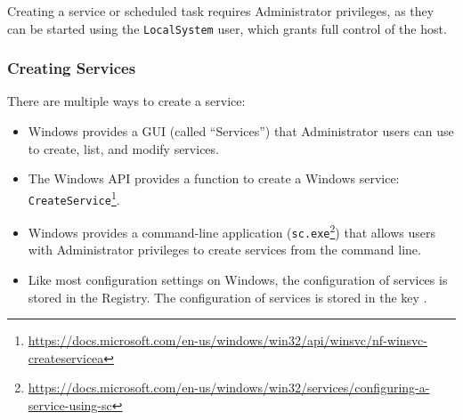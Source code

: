 Creating a service or scheduled task requires Administrator privileges, as they can be started using the \texttt{LocalSystem} user, which grants full control of the host.

\subsubsection{Creating Services}
There are multiple ways to create a service:
\begin{itemize}
    \item Windows provides a GUI (called ``Services'') that Administrator users can use to create, list, and modify services.

    \item The Windows API provides a function to create a Windows service: \texttt{CreateService}\footnote{\tiny \url{https://docs.microsoft.com/en-us/windows/win32/api/winsvc/nf-winsvc-createservicea}}.

    \item Windows provides a command-line application (\texttt{sc.exe}\footnote{\tiny \url{https://docs.microsoft.com/en-us/windows/win32/services/configuring-a-service-using-sc}}) that allows users with Administrator privileges to create services from the command line.

    \item Like most configuration settings on Windows, the configuration of services is stored in the Registry. The configuration of services is stored in the key .
\end{itemize}

